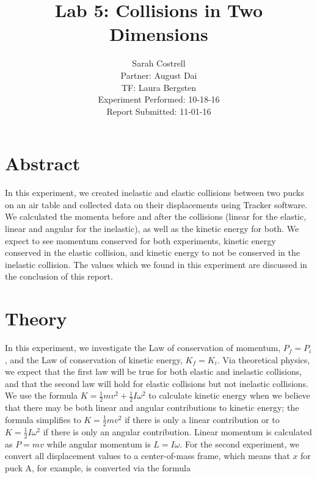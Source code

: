 \documentclass[11pt]{article}
\begin{document}

%
\author{Sarah Costrell\\Partner: August Dai\\TF: Laura Bergsten\\Experiment Performed: 10-18-16\\Report Submitted: 11-01-16}
\title{Lab 5: Collisions in Two Dimensions}
\date{}
\maketitle


\section{Abstract}

In this experiment, we created inelastic and elastic collisions between two pucks on an air table and collected data on their displacements using Tracker software. We calculated the momenta before and after the collisions (linear for the elastic, linear and angular for the inelastic), as well as the kinetic energy for both. We expect to see momentum conserved for both experiments, kinetic energy conserved in the elastic collision, and kinetic energy to not be conserved in the inelastic collision. The values which we found in this experiment are discussed in the conclusion of this report.

\section{Theory}
In this experiment, we investigate the Law of conservation of momentum, $P_f=P_i$, and the Law of conservation of kinetic energy, $K_f=K_i$. Via theoretical physics, we expect that the first law will be true for both elastic and inelastic collisions, and that the second law will hold for elastic collisions but not inelastic collisions. We use the formula $K=\frac{1}{2}mv^2+\frac{1}{2}I\omega^2$ to calculate kinetic energy when we believe that there may be both linear and angular contributions to kinetic energy; the formula simplifies to $K=\frac{1}{2}mv^2$ if there is only a linear contribution or to $K=\frac{1}{2}I\omega^2$ if there is only an angular contribution. Linear momentum is calculated as $P=mv$ while angular momentum is $L=I\omega$. For the second experiment, we convert all displacement values to a center-of-mass frame, which means that $x$ for puck A, for example, is converted via the formula
\end{document}
